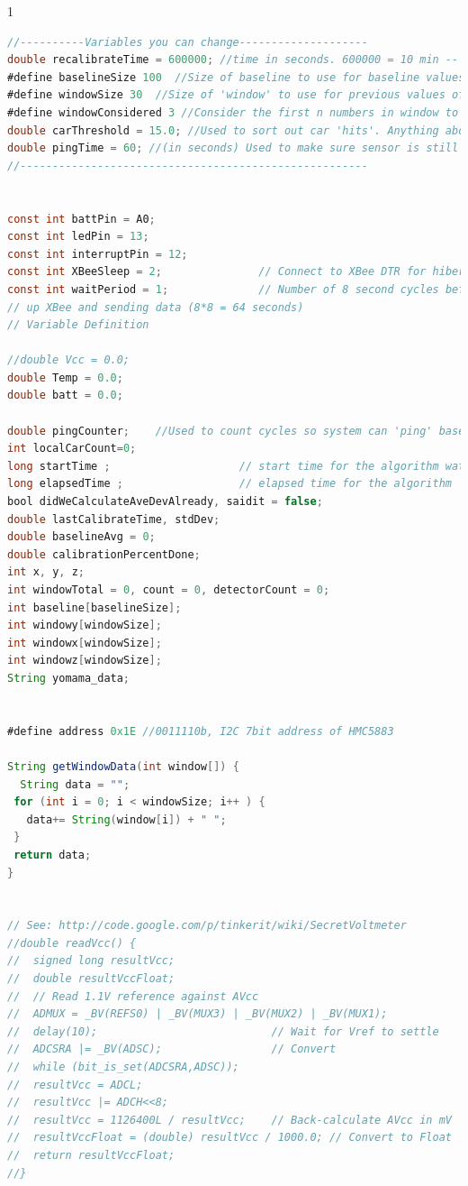 \documentclass[11pt, oneside, fullpage, doublespace]{article}
\begin{document}
\begin{spacing}{1}
\begin{lstlisting}[language=java]
//----------Variables you can change--------------------
double recalibrateTime = 600000; //time in seconds. 600000 = 10 min -- used to auto-recalibrate sensor, if time is greater than 10 minutes, recalibrate
#define baselineSize 100  //Size of baseline to use for baseline values
#define windowSize 30  //Size of 'window' to use for previous values of the sensor to be considered in calculating a positive detection.
#define windowConsidered 3 //Consider the first n numbers in window to determine direction
double carThreshold = 15.0; //Used to sort out car 'hits'. Anything above or below this 'threshold' is counted as a hit
double pingTime = 60; //(in seconds) Used to make sure sensor is still alive after specified time
//------------------------------------------------------


const int battPin = A0;
const int ledPin = 13;
const int interruptPin = 12;
const int XBeeSleep = 2;               // Connect to XBee DTR for hibernation mode
const int waitPeriod = 1;              // Number of 8 second cycles before waking
// up XBee and sending data (8*8 = 64 seconds)
// Variable Definition

//double Vcc = 0.0;
double Temp = 0.0;
double batt = 0.0;

double pingCounter;    //Used to count cycles so system can 'ping' basestation every 30 seconds
int localCarCount=0;
long startTime ;                    // start time for the algorithm watch
long elapsedTime ;                  // elapsed time for the algorithm
bool didWeCalculateAveDevAlready, saidit = false;
double lastCalibrateTime, stdDev;
double baselineAvg = 0;
double calibrationPercentDone;
int x, y, z;
int windowTotal = 0, count = 0, detectorCount = 0;
int baseline[baselineSize];
int windowy[windowSize];
int windowx[windowSize];
int windowz[windowSize];
String yomama_data;


#define address 0x1E //0011110b, I2C 7bit address of HMC5883

String getWindowData(int window[]) {
  String data = "";
 for (int i = 0; i < windowSize; i++ ) {
   data+= String(window[i]) + " ";
 }
 return data;
}
  

// See: http://code.google.com/p/tinkerit/wiki/SecretVoltmeter
//double readVcc() {
//  signed long resultVcc;
//  double resultVccFloat;
//  // Read 1.1V reference against AVcc
//  ADMUX = _BV(REFS0) | _BV(MUX3) | _BV(MUX2) | _BV(MUX1);
//  delay(10);                           // Wait for Vref to settle
//  ADCSRA |= _BV(ADSC);                 // Convert
//  while (bit_is_set(ADCSRA,ADSC));
//  resultVcc = ADCL;
//  resultVcc |= ADCH<<8;
//  resultVcc = 1126400L / resultVcc;    // Back-calculate AVcc in mV
//  resultVccFloat = (double) resultVcc / 1000.0; // Convert to Float
//  return resultVccFloat;
//}


\end{lstlisting}
\end{spacing}
\end{document}
